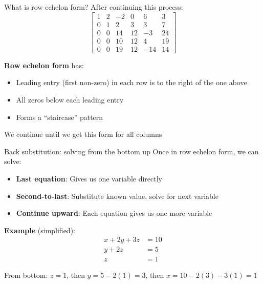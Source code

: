 \documentclass[aspectratio=169, lualatex, handout]{beamer}
\begin{document}
\begin{frame}{What is row echelon form?}
	After continuing this process:
	\[
		\left[\begin{array}{ccccc|c}
				1 & 2 & -2 & 0  & 6   & 3  \\
				0 & 1 & 2  & 3  & 3   & 7  \\
				0 & 0 & 14 & 12 & -3  & 24 \\
				0 & 0 & 10 & 12 & 4   & 19 \\
				0 & 0 & 19 & 12 & -14 & 14
			\end{array}\right]
	\]

	\textbf{Row echelon form} has:
	\begin{itemize}
		\item Leading entry (first non-zero) in each row is to the right of the one above
		\item All zeros below each leading entry
		\item Forms a ``staircase'' pattern
	\end{itemize}

	We continue until we get this form for all columns
\end{frame}

\begin{frame}{Back substitution: solving from the bottom up}
	Once in row echelon form, we can solve:
	\begin{itemize}
		\item \textbf{Last equation}: Gives us one variable directly
		\item \textbf{Second-to-last}: Substitute known value, solve for next variable
		\item \textbf{Continue upward}: Each equation gives us one more variable
	\end{itemize}

	\textbf{Example} (simplified):
	\begin{align*}
		x + 2y + 3z & = 10 \\
		y + 2z      & = 5  \\
		z           & = 1
	\end{align*}

	From bottom: $z = 1$, then $y = 5 - 2(1) = 3$, then $x = 10 - 2(3) - 3(1) = 1$
\end{frame}
\end{document}
